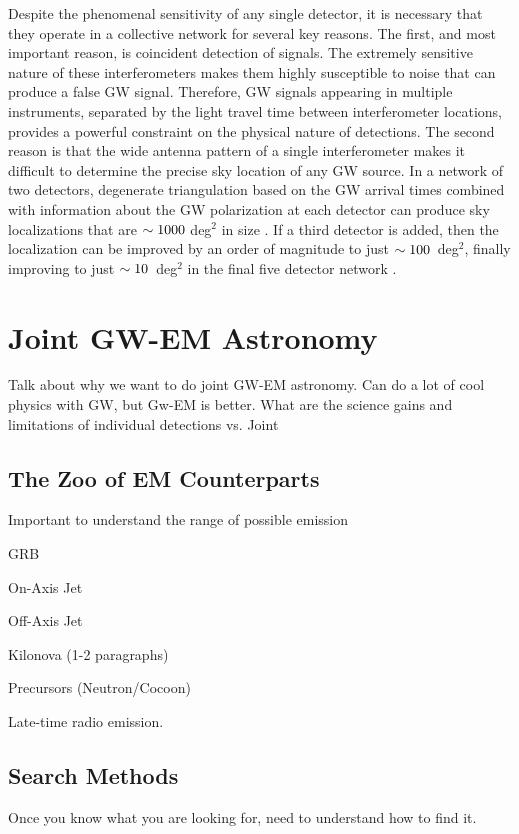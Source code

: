 Despite the phenomenal sensitivity of any single detector, it is necessary that they operate in a collective network for several key reasons. The first, and most important reason, is coincident detection of signals. The extremely sensitive nature of these interferometers makes them highly susceptible to noise that can produce a false GW signal. Therefore, GW signals appearing in multiple instruments, separated by the light travel time between interferometer locations, provides a powerful constraint on the physical nature of detections. The second reason is that the wide antenna pattern of a single interferometer makes it difficult to determine the precise sky location of any GW source. In a network of two detectors, degenerate triangulation based on the GW arrival times combined with information about the GW polarization at each detector can produce sky localizations that are $\sim1000$ deg$^2$ in size \citep[see e.g.,][]{LIGOLocalization,ChenHolz16}. If a third detector is added, then the localization can be improved by an order of magnitude to just $\sim100$~deg$^2$, finally improving to just $\sim10$~deg$^2$ in the final five detector network \citep[see e.g.,][]{LIGOLocalization,ChenHolz16}.


\section{Joint GW-EM Astronomy}
\label{sec:intro_joint}
Talk about why we want to do joint GW-EM astronomy. Can do a lot of cool physics with GW, but Gw-EM is better. What are the science gains and limitations of individual detections vs. Joint

\subsection{The Zoo of EM Counterparts}
\label{sec:intro_counterparts}
Important to understand the range of possible emission

GRB

On-Axis Jet

Off-Axis Jet

Kilonova (1-2 paragraphs)

Precursors (Neutron/Cocoon)

Late-time radio emission.

\subsection{Search Methods}
\label{sec:intro_searchmethods}
Once you know what you are looking for, need to understand how to find it. 

